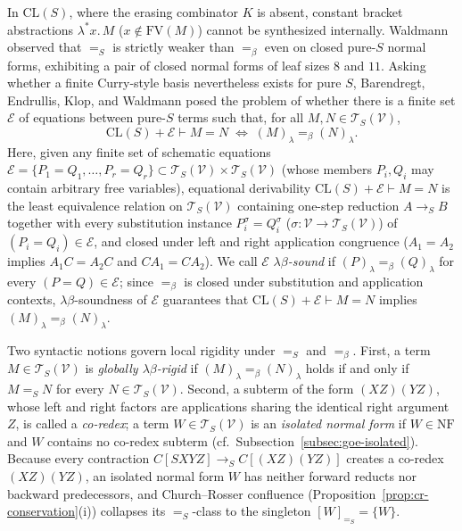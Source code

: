 \documentclass[11pt,reqno]{amsart}
\numberwithin{equation}{section}
\theoremstyle{plain}
\theoremstyle{definition}
\theoremstyle{remark}
\newcommand{\CLS}{\mathrm{CL}(S)}
\newcommand{\TSV}{\mathcal{T}_S(\mathcal{V})}
\newcommand{\NF}{\mathrm{NF}}
\newcommand{\redS}{\to_S}
\newcommand{\convS}{=_S}
\begin{document}
In $\CLS$, where the erasing combinator $K$ is absent, constant bracket abstractions $\lambda^* x.\, M$ ($x \notin \mathrm{FV}(M)$) cannot be synthesized internally. Waldmann \cite{Waldmann2000} observed that $\convS$ is strictly weaker than $=_\beta$ even on closed pure-$S$ normal forms, exhibiting a pair of closed normal forms of leaf sizes $8$ and $11$. Asking whether a finite Curry-style basis nevertheless exists for pure $S$, Barendregt, Endrullis, Klop, and Waldmann \cite[Question~32, p.~94]{BarendregtEndrullisKlopWaldmann2017} posed the problem of whether there is a finite set $\mathcal{E}$ of equations between pure-$S$ terms such that, for all $M, N \in \TSV$,
\begin{equation}\label{eq:q32-question}
  \CLS + \mathcal{E} \vdash M = N \;\iff\; (M)_\lambda =_\beta (N)_\lambda.
\end{equation}
Here, given any finite set of schematic equations $\mathcal{E} = \{P_1 = Q_1, \dots, P_r = Q_r\} \subset \TSV \times \TSV$ (whose members $P_i, Q_i$ may contain arbitrary free variables), equational derivability $\CLS + \mathcal{E} \vdash M = N$ is the least equivalence relation on $\TSV$ containing one-step reduction $A \redS B$ together with every substitution instance $P_i^\sigma = Q_i^\sigma$ ($\sigma \colon \mathcal{V} \to \TSV$) of $(P_i = Q_i) \in \mathcal{E}$, and closed under left and right application congruence ($A_1 = A_2$ implies $A_1 C = A_2 C$ and $C A_1 = C A_2$). We call $\mathcal{E}$ \emph{$\lambda\beta$-sound} if $(P)_\lambda =_\beta (Q)_\lambda$ for every $(P = Q) \in \mathcal{E}$; since $=_\beta$ is closed under substitution and application contexts, $\lambda\beta$-soundness of $\mathcal{E}$ guarantees that $\CLS + \mathcal{E} \vdash M = N$ implies $(M)_\lambda =_\beta (N)_\lambda$.

Two syntactic notions govern local rigidity under $\convS$ and $=_\beta$. First, a term $M \in \TSV$ is \emph{globally $\lambda\beta$-rigid} if $(M)_\lambda =_\beta (N)_\lambda$ holds if and only if $M \convS N$ for every $N \in \TSV$. Second, a subterm of the form $(X Z)(Y Z)$, whose left and right factors are applications sharing the identical right argument $Z$, is called a \emph{co-redex}; a term $W \in \TSV$ is an \emph{isolated normal form} if $W \in \NF$ and $W$ contains no co-redex subterm (cf.\ Subsection~\ref{subsec:goe-isolated}). Because every contraction $C[S X Y Z] \redS C[(X Z)(Y Z)]$ creates a co-redex $(X Z)(Y Z)$, an isolated normal form $W$ has neither forward reducts nor backward predecessors, and Church--Rosser confluence (Proposition~\ref{prop:cr-conservation}(i)) collapses its $\convS$-class to the singleton $[W]_{\convS} = \{W\}$.
\end{document}
